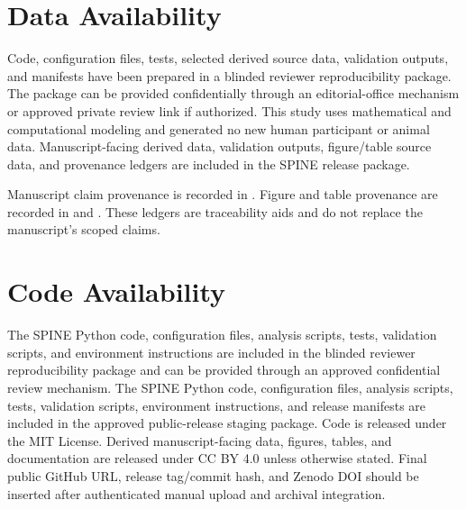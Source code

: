\section*{Data Availability}

\ifblind
Code, configuration files, tests, selected derived source data, validation outputs, and manifests have been prepared in a blinded reviewer reproducibility package. The package can be provided confidentially through an editorial-office mechanism or approved private review link if authorized.
\else
This study uses mathematical and computational modeling and generated no new human participant or animal data. Manuscript-facing derived data, validation outputs, figure/table source data, and provenance ledgers are included in the SPINE release package. \spinerepository
\fi

Manuscript claim provenance is recorded in . Figure and table provenance are recorded in  and . These ledgers are traceability aids and do not replace the manuscript's scoped claims.

\section*{Code Availability}

\ifblind
The SPINE Python code, configuration files, analysis scripts, tests, validation scripts, and environment instructions are included in the blinded reviewer reproducibility package and can be provided through an approved confidential review mechanism.
\else
The SPINE Python code, configuration files, analysis scripts, tests, validation scripts, environment instructions, and release manifests are included in the approved public-release staging package. Code is released under the MIT License. Derived manuscript-facing data, figures, tables, and documentation are released under CC BY 4.0 unless otherwise stated. Final public GitHub URL, release tag/commit hash, and Zenodo DOI should be inserted after authenticated manual upload and archival integration.
\fi
